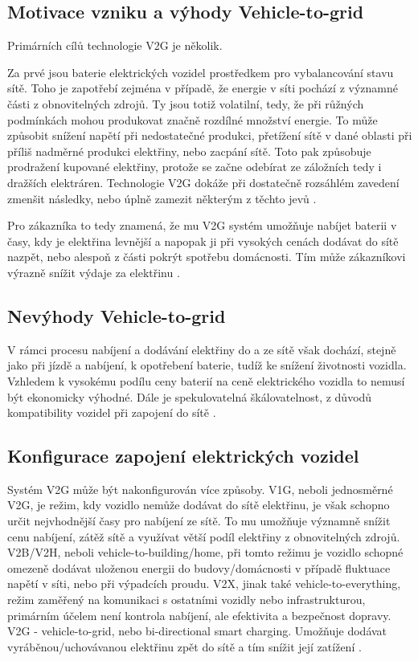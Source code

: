 \documentclass[12pt,a4paper]{article}
\begin{document}
\subsection{Motivace vzniku a výhody Vehicle-to-grid}
Primárních cílů technologie V2G je několik.

Za prvé jsou baterie elektrických vozidel prostředkem pro vybalancování stavu sítě. Toho je zapotřebí zejména v případě, že energie v síti pochází z významné části z obnovitelných zdrojů. Ty jsou totiž volatilní, tedy, že při růžných podmínkách mohou produkovat značně rozdílné množství energie. To může způsobit snížení napětí při nedostatečné produkci, přetížení sítě v dané oblasti při příliš nadměrné produkci elektřiny, nebo zacpání sítě. Toto pak způsobuje prodražení kupované elektřiny, protože se začne odebírat ze záložních tedy i dražších elektráren. Technologie V2G dokáže při dostatečně rozsáhlém zavedení zmenšit následky, nebo úplně zamezit některým z těchto jevů 
\cite{Greaker-Hagem-Proost-2022}.

Pro zákazníka to tedy znamená, že mu V2G systém umožňuje nabíjet baterii v časy, kdy je elektřina levnější a napopak ji při vysokých cenách dodávat do sítě nazpět, nebo alespoň z části pokrýt spotřebu domácnosti. Tím může zákazníkovi výrazně snížit výdaje za elektřinu 
\cite{Virta-Ltd-2021}.

\subsection{Nevýhody Vehicle-to-grid}
V rámci procesu nabíjení a dodávání elektřiny do a ze sítě však dochází, stejně jako při jízdě a nabíjení, k opotřebení baterie, tudíž ke snížení životnosti vozidla. Vzhledem k vysokému podílu ceny baterií na ceně elektrického vozidla to nemusí být ekonomicky výhodné.
Dále je spekulovatelná škálovatelnost, z důvodů kompatibility vozidel při zapojení do sítě 
\cite{Lakshmi-Divya-Sravani-2019}.

\subsection{Konfigurace zapojení elektrických vozidel}
Systém V2G může být nakonfigurován více způsoby.
V1G, neboli jednosměrné V2G, je režim, kdy vozidlo nemůže dodávat do sítě elektřinu,
je však schopno určit nejvhodnější časy pro nabíjení ze sítě. To mu umožňuje významně snížit cenu nabíjení, zátěž sítě a využívat větší podíl elektřiny z obnovitelných zdrojů.
V2B/V2H, neboli vehicle-to-building/home, při tomto režimu je vozidlo schopné omezeně dodávat uloženou energii do budovy/domácnosti v případě fluktuace napětí v síti, nebo při výpadcích proudu.
V2X, jinak také vehicle-to-everything, režim zaměřený na komunikaci s ostatními vozidly nebo infrastrukturou, primárním účelem není kontrola nabíjení, ale efektivita a bezpečnost dopravy.
V2G - vehicle-to-grid, nebo bi-directional smart charging. Umožňuje dodávat vyráběnou/uchovávanou elektřinu zpět do sítě a tím snížit její zatížení 
\cite{Svarc-2022}.
\end{document}

